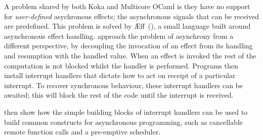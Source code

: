 \documentclass[msc,deptreport,cs]{infthesis} %
\newcommand\aeff{{\AE}ff\xspace}
\newcommand{\todo}[1]
           {{\par\noindent\small\color{RoyalPurple}
  \framebox{\parbox{\dimexpr\linewidth-2\fboxsep-2\fboxrule}
    {\textbf{TODO:} #1}}}}
\begin{document}
A problem shared by both Koka and Multicore OCaml is they have no support for
\emph{user-defined} asychronous effects; the asynchronous signals that can be
received are predefined. This problem is solved by
\aeff~(\cite{ahman2020asynchronous}), a small language built around asynchronous
effect handling. \citeauthor{ahman2020asynchronous} approach the problem of
asynchrony from a different perspective, by decoupling the invocation of an
effect from its handling and resumption with the handled value. When an effect
is invoked the rest of the computation is not blocked whilst the handler is
performed. Programs then install interrupt handlers that dictate how to act on
receipt of a particular interrupt. To recover synchronous behaviour, these
interrupt handlers can be \textsf{await}ed; this will block the rest of the code
until the interrupt is received.

\citeauthor{ahman2020asynchronous} then show how the simple building blocks of
interrupt handlers can be used to build common constructs for asynchronous
programming, such as cancellable remote function calls and a pre-emptive
scheduler.


%



\end{document}
